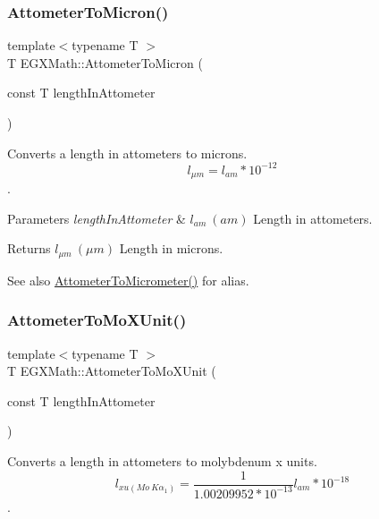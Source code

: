 \subsubsection{\texorpdfstring{Attometer\+To\+Micron()}{AttometerToMicron()}}
{\footnotesize\ttfamily template$<$typename T $>$ \\
T E\+G\+X\+Math\+::\+Attometer\+To\+Micron (\begin{DoxyParamCaption}\item[{const T}]{length\+In\+Attometer }\end{DoxyParamCaption})}



Converts a length in attometers to microns. \[ l_{\mu m}=l_{am} * 10^{-12} \]. 


\begin{DoxyParams}{Parameters}
{\em length\+In\+Attometer} & $ l_{am}\ (am)$ Length in attometers. \\
\hline
\end{DoxyParams}
\begin{DoxyReturn}{Returns}
$ l_{\mu m}\ (\mu m)$ Length in microns. 
\end{DoxyReturn}
\begin{DoxySeeAlso}{See also}
\mbox{\hyperlink{group___e_g_x_math-_conversions-_length_conversions-_attometer-_s_i_gaa98a14657ea865a6cac8fb8fc42172a2}{Attometer\+To\+Micrometer()}} for alias. 
\end{DoxySeeAlso}
\mbox{\label{group___e_g_x_math-_conversions-_length_conversions-_attometer-_non-_s_i_ga79ec6f4ec4a97af05fe8f69b80805ab7}} 
\subsubsection{\texorpdfstring{Attometer\+To\+Mo\+X\+Unit()}{AttometerToMoXUnit()}}
{\footnotesize\ttfamily template$<$typename T $>$ \\
T E\+G\+X\+Math\+::\+Attometer\+To\+Mo\+X\+Unit (\begin{DoxyParamCaption}\item[{const T}]{length\+In\+Attometer }\end{DoxyParamCaption})}



Converts a length in attometers to molybdenum x units. \[ l_{xu(Mo\ K\alpha_1)}=\frac{1}{1.00209952*10^{-13}} l_{am} * 10^{-18} \]. 


